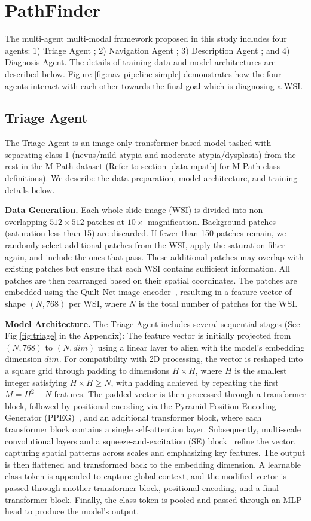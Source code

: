 \section{PathFinder}
\label{sec:methods}
The multi-agent multi-modal framework proposed in this study includes four agents: 1) Triage Agent ; 2) Navigation Agent ; 3) Description Agent ; and 4) Diagnosis Agent. The details of training data and model architectures are described below. Figure \ref{fig:nav-pipeline-simple} demonstrates how the four agents interact with each other towards the final goal which is diagnosing a WSI.

\subsection{Triage Agent}
The Triage Agent is an image-only transformer-based model tasked with separating class 1 (nevus/mild atypia and moderate atypia/dysplasia) from the rest in the M-Path dataset (Refer to section \ref{data-mpath} for M-Path class definitions). We describe the data preparation, model architecture, and training details below.

\noindent\textbf{Data Generation.} Each whole slide image (WSI) is divided into non-overlapping $512 \times 512$ patches at $10\times$ magnification. Background patches (saturation less than 15) are discarded. If fewer than 150 patches remain, we randomly select additional patches from the WSI, apply the saturation filter again, and include the ones that pass. These additional patches may overlap with existing patches but ensure that each WSI contains sufficient information. All patches are then rearranged based on their spatial coordinates. The patches are embedded using the Quilt-Net image encoder~\cite{ikezogwo2023quilt}, resulting in a feature vector of shape $(N, 768)$ per WSI, where $N$ is the total number of patches for the WSI.

\noindent
\textbf{Model Architecture.} The Triage Agent includes several sequential stages (See Fig \ref{fig:triage} in the Appendix): The feature vector is initially projected from $(N, 768)$ to $(N, dim)$ using a linear layer to align with the model’s embedding dimension $dim$. For compatibility with 2D processing, the vector is reshaped into a square grid through padding to dimensions $H \times H$, where $H$ is the smallest integer satisfying $H \times H \geq N$, with padding achieved by repeating the first $M = H^2 - N$ features. The padded vector is then processed through a transformer block, followed by positional encoding via the Pyramid Position Encoding Generator (PPEG)~\cite{shao2021transmil}, and an additional transformer block, where each transformer block contains a single self-attention layer. Subsequently, multi-scale convolutional layers and a squeeze-and-excitation (SE) block~\cite{hu2018senet} refine the vector, capturing spatial patterns across scales and emphasizing key features. The output is then flattened and transformed back to the embedding dimension. A learnable class token is appended to capture global context, and the modified vector is passed through another transformer block, positional encoding, and a final transformer block. Finally, the class token is pooled and passed through an MLP head to produce the model’s output.

